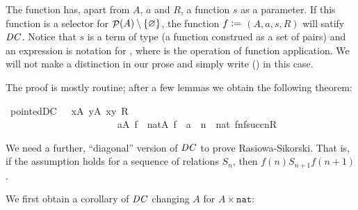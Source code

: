 The function  has, apart from $A$, $a$ and $R$, a
function $s$ as a parameter. If this function is a selector for
$\mathop{\mathcal{P}}(A)\setminus \{\varnothing\}$, the function $f\mathrel{\mathop:}= {}$$(A,a,s,R)$
will satify $\mathit{DC}$. Notice that $s$ is a term of type  (a
function construed as a set of pairs) and an expression
 is notation for  ,
where
is the operation of function application. We will not make a
distinction in our prose and simply write () in this case.

The proof is mostly routine; after a few lemmas we obtain the
following theorem:

\begin{isabelle}
\isamarkupfalse%
\ pointed{\isacharunderscore}DC\ \ {\isacharcolon}\ {\isachardoublequoteopen}{\isacharparenleft}{\isasymforall}x{\isasymin}A{\isachardot}\ {\isasymexists}y{\isasymin}A{\isachardot}\ {\isasymlangle}x{\isacharcomma}y{\isasymrangle}{\isasymin}\ R{\isacharparenright}\ {\isasymLongrightarrow}\isanewline
\ \ \ \ \ \ \ \ \ \ \ \ \ \ \ \ \ \ \ \ \ \ \ {\isasymforall}a{\isasymin}A{\isachardot}\ {\isacharparenleft}{\isasymexists}f\ {\isasymin}\ nat{\isasymrightarrow}A{\isachardot}\ f{\isacharbackquote}{}\ {\isacharequal}\ a\ {\isasymand}\ {\isacharparenleft}{\isasymforall}n\ {\isasymin}\ nat{\isachardot}\ {\isasymlangle}f{\isacharbackquote}n{\isacharcomma}f{\isacharbackquote}succ{\isacharparenleft}n{\isacharparenright}{\isasymrangle}{\isasymin}R{\isacharparenright}{\isacharparenright}{\isachardoublequoteclose}
\end{isabelle}

We need a further, ``diagonal'' version of $\mathit{DC}$  to prove
Rasiowa-Sikorski. That is, if the assumption holds for a sequence of
relations $S_n$,  then $f(n) \mathrel{S_{n+1}} f(n+1)$.

We first obtain a corollary of $\mathit{DC}$ changing $A$ for
$A\times\mathtt{nat}$:

